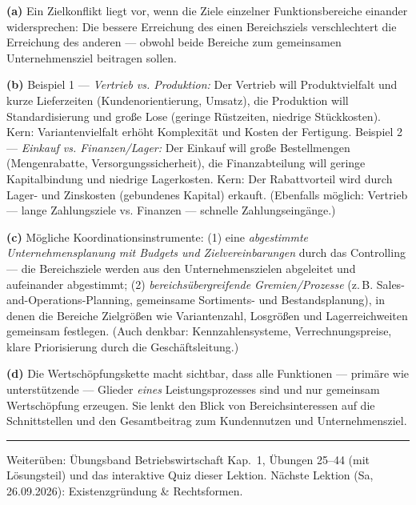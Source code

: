 \documentclass[11pt, a4paper]{article}
\begin{document}
\begin{loesung}[title={Lösung Aufgabe~9 --- Zielkonflikte zwischen Funktionsbereichen}]
\textbf{(a)} Ein Zielkonflikt liegt vor, wenn die Ziele einzelner Funktionsbereiche
einander widersprechen: Die bessere Erreichung des einen Bereichsziels verschlechtert
die Erreichung des anderen --- obwohl beide Bereiche zum gemeinsamen Unternehmensziel
beitragen sollen.

\textbf{(b)} Beispiel 1 --- \emph{Vertrieb vs. Produktion:} Der Vertrieb will
Produktvielfalt und kurze Lieferzeiten (Kundenorientierung, Umsatz), die Produktion will
Standardisierung und große Lose (geringe Rüstzeiten, niedrige Stückkosten). Kern:
Variantenvielfalt erhöht Komplexität und Kosten der Fertigung.
Beispiel 2 --- \emph{Einkauf vs. Finanzen/Lager:} Der Einkauf will große Bestellmengen
(Mengenrabatte, Versorgungssicherheit), die Finanzabteilung will geringe Kapitalbindung
und niedrige Lagerkosten. Kern: Der Rabattvorteil wird durch Lager- und Zinskosten
(gebundenes Kapital) erkauft. (Ebenfalls möglich: Vertrieb --- lange Zahlungsziele vs.
Finanzen --- schnelle Zahlungseingänge.)

\textbf{(c)} Mögliche Koordinationsinstrumente: (1) eine \emph{abgestimmte
Unternehmensplanung mit Budgets und Zielvereinbarungen} durch das Controlling --- die
Bereichsziele werden aus den Unternehmenszielen abgeleitet und aufeinander abgestimmt;
(2) \emph{bereichsübergreifende Gremien/Prozesse} (z.\,B. Sales-and-Operations-Planning,
gemeinsame Sortiments- und Bestandsplanung), in denen die Bereiche Zielgrößen wie
Variantenzahl, Losgrößen und Lagerreichweiten gemeinsam festlegen. (Auch denkbar:
Kennzahlensysteme, Verrechnungspreise, klare Priorisierung durch die Geschäftsleitung.)

\textbf{(d)} Die Wertschöpfungskette macht sichtbar, dass alle Funktionen --- primäre wie
unterstützende --- Glieder \emph{eines} Leistungsprozesses sind und nur gemeinsam
Wertschöpfung erzeugen. Sie lenkt den Blick von Bereichsinteressen auf die Schnittstellen
und den Gesamtbeitrag zum Kundennutzen und Unternehmensziel.
\end{loesung}

\vspace{1em}
\hrule
\vspace{0.8em}
\noindent\textsf{\small Weiterüben: Übungsband Betriebswirtschaft Kap.~1, Übungen 25--44
(mit Lösungsteil) und das interaktive Quiz dieser Lektion. Nächste Lektion (Sa, 26.09.2026):
Existenzgründung \& Rechtsformen.}
\end{document}
